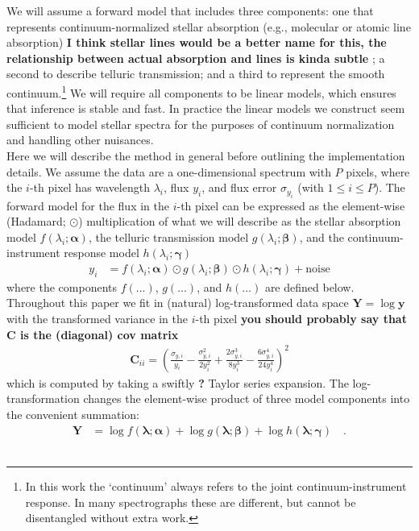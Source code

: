 \documentclass[modern]{aastex631}
\renewcommand{\vec}[1]{\mathbf{#1}}
\newcommand{\vecalpha}{\boldsymbol{\alpha}}
\newcommand{\vecbeta}{\boldsymbol{\beta}}
\newcommand{\vecgamma}{\boldsymbol{\gamma}}
\newcommand{\hadamard}{\odot}
\newcommand{\ajw}[1]{\textbf{#1}}
\begin{document}
We will assume a forward model that includes three components: one that represents continuum-normalized stellar absorption (e.g., molecular or atomic line absorption) \ajw{I think stellar lines   would be a better name for this, the relationship between actual absorption and lines is kinda subtle }; a second to describe telluric transmission; and a third to represent the smooth continuum.\footnote{In this work the `continuum' always refers to the joint continuum-instrument response. In many spectrographs these are different, but cannot be disentangled without extra work.} We will require all components to be linear models, which ensures that inference is stable and fast. In practice the linear models we construct seem sufficient to model stellar spectra for the purposes of continuum normalization and handling other nuisances.\\


Here we will describe the method in general before outlining the implementation details. We assume the data are a one-dimensional spectrum with $P$ pixels, where the $i$-th pixel has wavelength $\lambda_i$, flux $y_i$, and flux error $\sigma_{y_i}$ (with $1 \leq i \leq P$). The forward model for the flux in the $i$-th pixel can be expressed as the element-wise (Hadamard; $\hadamard$) multiplication of what we will describe as the stellar absorption model $f(\lambda_i; \vecalpha)$, the telluric transmission model $g(\lambda_i; \vecbeta)$, and the continuum-instrument response model $h(\lambda_i;\vecgamma)$
\begin{align}\label{eq:y}
    y_i &= f(\lambda_i;\vecalpha)\hadamard{}g(\lambda_i;\vecbeta)\hadamard{}h(\lambda_i;\vecgamma) + \mbox{noise}
\end{align}
where the components $f(...)$, $g(...)$, and $h(...)$ are defined below. Throughout this paper we fit in (natural) log-transformed data space $\vec{Y} = \log{\vec{y}}$ with the transformed variance in the $i$-th pixel
\ajw{you should probably say that C is the (diagonal) cov matrix}
\begin{eqnarray}
    \vec{C}_{ii} = \left(\frac{\sigma_{y,i}}{y_i} - \frac{\sigma_{y,i}^2}{2y_i^2} + \frac{2\sigma_{y,i}^3}{8y_i^3} - \frac{6\sigma_{y,i}^4}{24y_i^4}\right)^2
\end{eqnarray}
\noindent{}which is computed by taking a swiftly \ajw{?} Taylor series expansion. The log-transformation changes the element-wise product of three model components into the convenient summation:
\begin{align}
    \label{eq:log_y}
    \vec{Y} &= \log{f(\vec{\lambda}; \vecalpha)} + \log{g(\vec{\lambda};\vecbeta)} + \log{h(\vec{\lambda};\vecgamma)} \quad .
\end{align}\\
\end{document}
